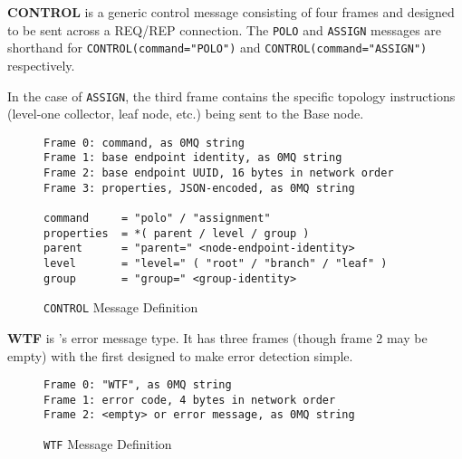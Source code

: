 \textbf{CONTROL} is a generic control message consisting of four frames and designed to be sent across a REQ/REP
connection. The \texttt{POLO} and \texttt{ASSIGN} messages are shorthand for \texttt{CONTROL(command="POLO")} and
\texttt{CONTROL(command="ASSIGN")} respectively.

In the case of \texttt{ASSIGN}, the third frame contains the specific topology instructions (level-one collector, leaf
node, etc.) being sent to the Base node.

\begin{figure}[ht]
\vspace{+10pt}
\begin{verbatim}
Frame 0: command, as 0MQ string
Frame 1: base endpoint identity, as 0MQ string
Frame 2: base endpoint UUID, 16 bytes in network order
Frame 3: properties, JSON-encoded, as 0MQ string

command     = "polo" / "assignment"
properties  = *( parent / level / group )
parent      = "parent=" <node-endpoint-identity>
level       = "level=" ( "root" / "branch" / "leaf" )
group       = "group=" <group-identity>
\end{verbatim}
\vspace{-20pt}
\caption{\texttt{CONTROL} Message Definition}
\label{fig:message_control}
\end{figure}

\textbf{WTF} is \dcamp's error message type. It has three frames (though frame 2 may be empty) with the first designed
to make error detection simple.

\begin{figure}[ht]
\vspace{+10pt}
\begin{verbatim}
Frame 0: "WTF", as 0MQ string
Frame 1: error code, 4 bytes in network order
Frame 2: <empty> or error message, as 0MQ string
\end{verbatim}
\vspace{-20pt}
\caption{\texttt{WTF} Message Definition}
\label{fig:message_wtf}
\end{figure}
